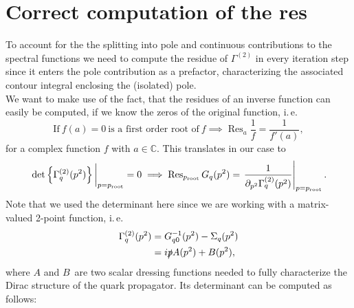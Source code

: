 \documentclass[digital, %
			   openright, %
			   parskip=half,
			   11pt]{mythesis}
\begin{document}
\pagestyle{plain}

\section*{Correct computation of the res}
To account for the the splitting  into pole and continuous contributions to the spectral functions we need to compute the residue of $\Gamma^{(2)}$ in every iteration step since it enters the pole contribution as a prefactor, characterizing the associated contour integral enclosing the (isolated) pole.\\
We want to make use of the fact, that the residues of an inverse function can easily be computed, if we know the zeros of the original function, i.\,e.
\begin{equation}
	\text{If}\ f(a) = 0\ \text{is a first order root of}\ f \implies \operatorname{Res}_a \frac{1}{f} = \frac{1}{f'(a)},
\end{equation} 
for a complex function $f$ with $a\in\mathbb{C}$.
This translates in our case to
\begin{equation}
	 \eval{\det \left\{\Gamma_q^{(2)}(p^2)\right\}}_{p=p_{\mathrm{root}}} = 0 \implies \operatorname{Res}_{p_{\mathrm{root}}} G_q(p^2) = \eval{\frac{1}{\partial_{p^2}\Gamma_q^{(2)}(p^2)}}_{p=p_{\mathrm{root}}}.
\end{equation}
Note that we used the determinant here since we are working with a matrix-valued 2-point function, i.\,e.
\begin{equation}
\begin{aligned}
		\Gamma^{(2)}_q(p^2)  &= G_{q0}^{-1}(p^2) - \Sigma_q(p^2) \\
		&= i\slashed{p} A(p^2) + B(p^2),
\end{aligned}
\end{equation}
where $A$ and $B$\ are two scalar dressing functions needed to fully characterize the Dirac structure of the quark propagator. Its determinant can be computed as follows:
\end{document}
